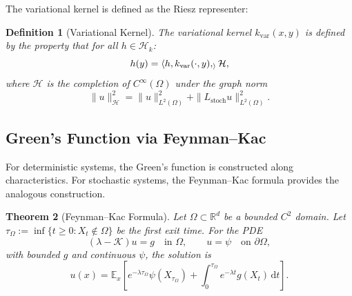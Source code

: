 \documentclass[11pt,a4paper]{article}
\newtheorem{theorem}{Theorem}[section]
\newtheorem{definition}[theorem]{Definition}
\newcommand{\R}{\mathbb{R}}
\newcommand{\E}{\mathbb{E}}
\newcommand{\dt}{\,\mathrm{d}t}
\newcommand{\RKHS}{\mathcal{H}_k}
\newcommand{\Koop}{\mathcal{K}}
\newcommand{\inner}[2]{\langle #1, #2 \rangle}
\newcommand{\norm}[1]{\| #1 \|}
\begin{document}
The variational kernel is defined as the Riesz representer:

\begin{definition}[Variational Kernel]\label{def:var_kernel}
The variational kernel $k_{\mathrm{var}}(x,y)$ is defined by the property that for all $h \in \RKHS$:
\begin{equation}
h(y) = \inner{h, k_{\mathrm{var}}(\cdot, y)}_\mathcal{H},
\end{equation}
where $\mathcal{H}$ is the completion of $C^\infty(\Omega)$ under the graph norm
\begin{equation}
\norm{u}_\mathcal{H}^2 = \norm{u}_{L^2(\Omega)}^2 + \norm{L_{\mathrm{stoch}} u}_{L^2(\Omega)}^2.
\end{equation}
\end{definition}

\subsection{Green's Function via Feynman--Kac}

For deterministic systems, the Green's function is constructed along characteristics. For stochastic systems, the Feynman--Kac formula provides the analogous construction.

\begin{theorem}[Feynman--Kac Formula]\label{thm:feynman_kac}
Let $\Omega \subset \R^d$ be a bounded $C^2$ domain. Let $\tau_\Omega := \inf\{t \geq 0: X_t \notin \Omega\}$ be the first exit time. For the PDE
\begin{equation}
(\lambda - \Koop) u = g \quad \text{in } \Omega, \qquad u = \psi \quad \text{on } \partial\Omega,
\end{equation}
with bounded $g$ and continuous $\psi$, the solution is
\begin{equation}\label{eq:feynman_kac}
u(x) = \E_x\left[e^{-\lambda \tau_\Omega} \psi(X_{\tau_\Omega}) + \int_0^{\tau_\Omega} e^{-\lambda t} g(X_t) \dt\right].
\end{equation}
\end{theorem}
\end{document}
